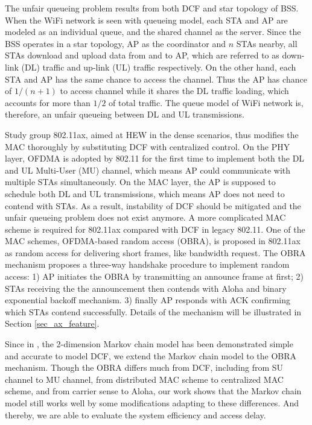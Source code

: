 \documentclass[journal]{IEEEtran}
\begin{document}
The unfair queueing problem results from both DCF and star topology of BSS.
When the WiFi network is seen with queueing model, each STA and AP are modeled as an individual queue, and the shared channel as the server. 
Since the BSS operates in a star topology, AP as the coordinator and $n$ STAs nearby, all STAs download and upload data from and to AP, which are referred to as down-link (DL) traffic and up-link (UL) traffic respectively.
On the other hand, each STA and AP has the same chance to access the channel. 
Thus the AP has chance of $1/(n+1)$ to access channel while it shares the DL traffic loading, which accounts for more than $1/2$ of total traffic.
The queue model of WiFi network is, therefore, an unfair queueing between DL and UL transmissions. 


Study group 802.11ax, aimed at HEW in the dense scenarios, thus modifies the MAC thoroughly by substituting DCF with centralized control. 
On the PHY layer, OFDMA is adopted by 802.11 for the first time to implement both the DL and UL Multi-User (MU) channel, which means AP could communicate with multiple STAs simultaneously.
On the MAC layer, the AP is supposed to schedule both DL and UL transmissions, which means AP does not need to contend with STAs. 
As a result, instability of DCF should be mitigated and the unfair queueing problem does not exist anymore.
A more complicated MAC scheme is required for 802.11ax compared with DCF in legacy 802.11.
One of the MAC schemes, OFDMA-based random access (OBRA), is proposed in 802.11ax as random access for delivering short frames, like bandwidth request. 
The OBRA mechanism proposes a three-way handshake procedure to implement random access:
1) AP initiates the OBRA by transmitting an announce frame at first;
2) STAs receiving the the announcement then contends with Aloha and binary exponential backoff mechanism. 
3) finally AP responds with ACK confirming which STAs contend successfully.
Details of the mechanism will be illustrated in Section \ref{sec_ax_feature}.



Since in \cite{bianchi2000performance}, the 2-dimension Markov chain model has been demonstrated simple and accurate to model DCF, we extend the Markov chain model to the OBRA mechanism.
Though the OBRA differs much from DCF, including from SU channel to MU channel, from distributed MAC scheme to centralized MAC scheme, and from carrier sense to Aloha, our work shows that the Markov chain model still works well by some modifications adapting to these differences.
And thereby, we are able to evaluate the system efficiency and access delay. 
\end{document}
